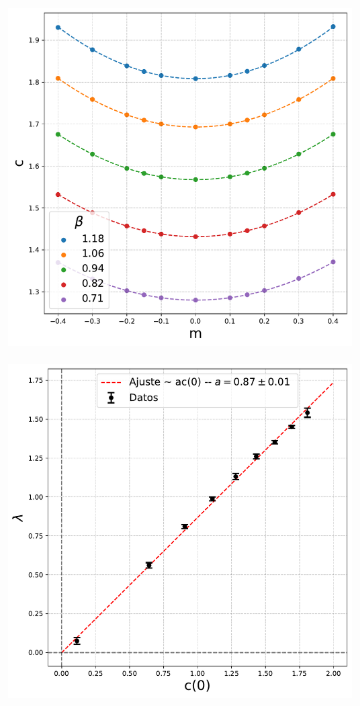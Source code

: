 \begin{figure}[h]
    \hspace*{-1cm}
\begin{subfigure}{0.55\textwidth}
    \centering
    \includegraphics[width=\textwidth]{tilted_velocity.pdf}
    \caption{}
\end{subfigure}
\begin{subfigure}{0.55\textwidth}
    \centering
    \includegraphics[width=\textwidth]{lambdavsc.pdf}

\end{subfigure}
\end{figure}
